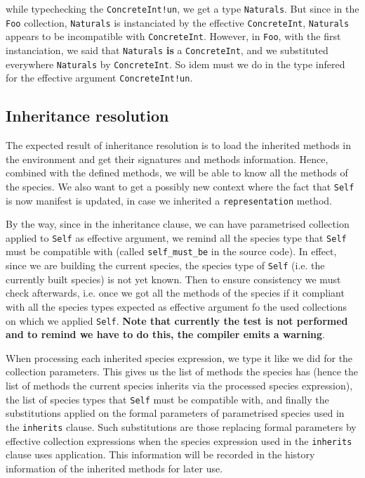 \noindent while typechecking the {\tt ConcreteInt!un}, we get a type
{\tt Naturals}. But since in the {\tt Foo} collection, {\tt Naturals} is
instanciated by the effective {\tt ConcreteInt}, {\tt Naturals} appears
to be incompatible with {\tt ConcreteInt}. However, in {\tt Foo}, with
the first instanciation, we said that {\tt Naturals} {\bf is} a
{\tt ConcreteInt}, and we substituted everywhere {\tt Naturals} by
{\tt ConcreteInt}. So idem must we do in the type infered for the
effective argument {\tt ConcreteInt!un}.



\subsection{Inheritance resolution}
\label{inheritance-resolution}
The expected result of inheritance resolution is to load the inherited
methods in the environment and get their signatures and methods
information. Hence, combined with the defined methods, we will be able
to know all the methods of the species. We also want to get a possibly
new context where the fact that {\tt Self} is now manifest is
updated, in case we inherited a {\tt representation} method.

By the way, since in the inheritance clause, we can have parametrised
collection applied to {\tt Self} as effective argument, we remind all
the species type that {\tt Self} must be compatible with (called
{\tt self\_must\_be} in the source code). In effect, since we are
building the current species, the species type of {\tt Self} (i.e. the
currently built species) is not yet known. Then to ensure consistency
we must check afterwards, i.e. once we got all the methods of the
species if it compliant with all the species types expected as
effective argument fo the used collections on which we applied
{\tt Self}.
\label{cadaver-self-must-be}
{\bf {\large Note that currently the test is not performed
and to remind we have to do this, the compiler emits a warning}}.

\medskip
When processing each inherited species expression, we type it like we
did for the collection parameters. This gives us the list of methods
the species has (hence the list of methods the current species inherits
via the processed species expression), the list of species types that
{\tt Self} must be compatible with, and finally the substitutions
applied on the formal parameters of parametrised species used in the
{\tt inherits} clause. Such substitutions are those replacing formal
parameters by effective collection expressions when the species
expression used in the {\tt inherits} clause uses application.
This information will be recorded in the history information of the
inherited methods for later use.

